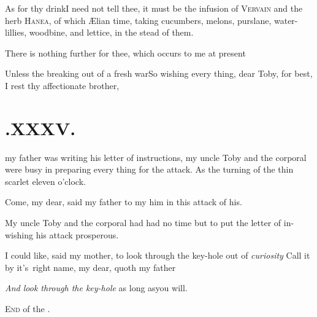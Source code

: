 \documentclass[twoside]{article}
\begin{document}
As for thy drink\tsk I need not tell thee, it must be the
infusion of \textsc{Vervain} and the herb
\textsc{Hanea}, of which Ælian
time, taking cucumbers, melons, purs\-lane, water-lillies, woodbine, and lettice,
in the stead of them.

There is nothing further for thee, which occurs to me at
present\tsh

\tsh Unless the breaking out of a fresh
war\tsh So wishing every thing, dear Toby, for
best,\\[3pt]
\indent I rest thy affectionate brother,\\[3pt]

\section{.\enspace XXXV.}

 my father was writing\break
his letter of instructions, my\break
uncle Toby and the corporal were busy\break
in preparing every thing for the attack.\break
As the turning of the thin scarlet 
eleven o’clock.

Come, my dear, said my father to my 
him in this attack of his.

\vskip -6pt

My uncle Toby and the corporal had
had no time but to put the letter of in- 
wishing his attack prosperous.

I could like, said my mother, to look 
through the key-hole out of \textit{curiosity}\tsh\break
Call it by it’s\sic\ right name, my dear,\break
quoth my father\tsk 

\textit{And look through the key-hole} as long
as\break you will.

\vfill
\centerline{\textsc{End} of the .}
\vfill
\end{document}
